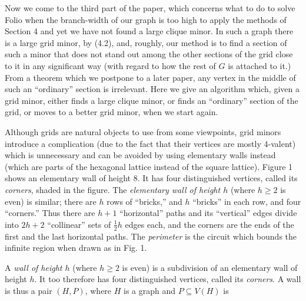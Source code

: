
Now we come to the third part of the paper, which concerns what to do to solve Folio when the branch-width of our graph is too high to apply the methods of Section 4 and yet we have not found a large clique minor. In such a graph there is a large grid minor, by (4.2), and, roughly, our method is to find a section of such a minor that does not stand out among the other sections of the grid close to it in any significant way (with regard to how the rest of $G$ is attached to it.) From a theorem which we postpone to a later paper, any vertex in the middle of such an ``ordinary'' section is irrelevant. Here we give an algorithm which, given a grid minor, either finds a large clique minor, or finds an ``ordinary'' section of the grid, or moves to a better grid minor, when we start again.

Although grids are natural objects to use from some viewpoints, grid minors introduce a complication (due to the fact that their vertices are mostly 4-valent) which is unnecessary and can be avoided by using elementary walls instead (which are parts of the hexagonal lattice instead of the square lattice). Figure 1 shows an elementary wall of height 8. It has four distinguished vertices, called its \textit{corners}, shaded in the figure. The \textit{elementary wall of height $h$} (where $h \ge 2$ is even) is similar; there are $h$ rows of ``bricks,'' and $h$ ``bricks'' in each row, and four ``corners.'' Thus there are $h+1$ ``horizontal'' paths and its ``vertical'' edges divide into $2h+2$ ``collinear'' sets of $\frac{1}{2}h$ edges each, and the corners are the ends of the first and the last horizontal paths. The \textit{perimeter} is the circuit which bounds the infinite region when drawn as in Fig. 1.

A \textit{wall of height $h$} (where $h \ge 2$ is even) is a subdivision of an elementary wall of height $h$. It too therefore has four distinguished vertices, called its \textit{corners}. A wall is thus a pair $(H, P)$, where $H$ is a graph and $P \subseteq V(H)$ is

